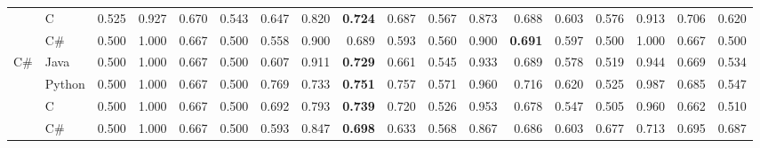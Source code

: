 \documentclass[10pt]{article}
\newcommand{\best}[1]{\cellcolor{bestgreen}\textbf{#1}}
\begin{document}
\begin{landscape}
\begin{table}[p]
{\begin{tabular}{llrrrrrrrrrrrrrrrr}
 & C & 0.525 & 0.927 & 0.670 & 0.543 & 0.647 & 0.820 & \best{0.724} & 0.687 & 0.567 & 0.873 & 0.688 & 0.603 & 0.576 & 0.913 & 0.706 & 0.620 \\
 & C\# & 0.500 & 1.000 & 0.667 & 0.500 & 0.558 & 0.900 & 0.689 & 0.593 & 0.560 & 0.900 & \best{0.691} & 0.597 & 0.500 & 1.000 & 0.667 & 0.500 \\
\midrule
\multirow{4}{*}{C\#} & Java & 0.500 & 1.000 & 0.667 & 0.500 & 0.607 & 0.911 & \best{0.729} & 0.661 & 0.545 & 0.933 & 0.689 & 0.578 & 0.519 & 0.944 & 0.669 & 0.534 \\
 & Python & 0.500 & 1.000 & 0.667 & 0.500 & 0.769 & 0.733 & \best{0.751} & 0.757 & 0.571 & 0.960 & 0.716 & 0.620 & 0.525 & 0.987 & 0.685 & 0.547 \\
 & C & 0.500 & 1.000 & 0.667 & 0.500 & 0.692 & 0.793 & \best{0.739} & 0.720 & 0.526 & 0.953 & 0.678 & 0.547 & 0.505 & 0.960 & 0.662 & 0.510 \\
 & C\# & 0.500 & 1.000 & 0.667 & 0.500 & 0.593 & 0.847 & \best{0.698} & 0.633 & 0.568 & 0.867 & 0.686 & 0.603 & 0.677 & 0.713 & 0.695 & 0.687 \\
\bottomrule
\end{tabular}
}
\end{table}
\end{landscape}
\end{document}
